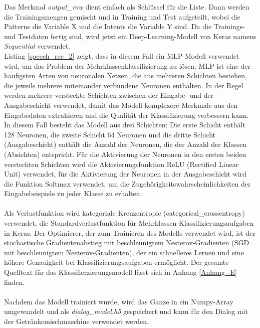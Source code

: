 Das Merkmal \textit{output\_row} dient einfach als Schlüssel für die Liste. 
Dann werden die Trainingsmengen gemischt und in Training und Test aufgeteilt, wobei die Patterns die Variable X und die Intents die Variable Y sind. 
Da die Trainings- und Testdaten fertig sind, wird jetzt ein Deep-Learning-Modell von Keras namens \textit{Sequential} verwendet.\\

Listing \ref{speech_rec_2} zeigt, dass in diesem Fall ein \ac{MLP}-Modell verwendet wird, um das Problem der Mehrklassenklassifizierung zu lösen. 
\ac{MLP} ist eine der häufigsten Arten von neuronalen Netzen, die aus mehreren Schichten bestehen, die jeweils mehrere miteinander verbundene Neuronen enthalten. 
In der Regel werden mehrere versteckte Schichten zwischen der Eingabe- und der Ausgabeschicht verwendet, damit das Modell komplexere Merkmale aus den Eingabedaten extrahieren und die Qualität der Klassifizierung verbessern kann. 
In diesem Fall besteht das Modell aus drei Schichten: Die erste Schicht enthält 128 Neuronen, die zweite Schicht 64 Neuronen und die dritte Schicht (Ausgabeschicht) enthält die Anzahl der Neuronen, die der Anzahl der Klassen (Absichten) entspricht. 
Für die Aktivierung der Neuronen in den ersten beiden versteckten Schichten wird die Aktivierungsfunktion ReLU (Rectified Linear Unit) verwendet, für die Aktivierung der Neuronen in der Ausgabeschicht wird die Funktion Softmax verwendet, um die Zugehörigkeitswahrscheinlichkeiten der Eingabebeispiele zu jeder Klasse zu erhalten.\\\\
Als Verlustfunktion wird kategoriale Kreuzentropie (categorical\_crossentropy) verwendet, die Standardverlustfunktion für Mehrklassen-Klassifizierungsaufgaben in Keras. 
Der Optimierer, der zum Trainieren des Modells verwendet wird, ist der stochastische Gradientenabstieg mit beschleunigtem Nesterov-Gradienten (SGD mit beschleunigtem Nesterov-Gradienten), der ein schnelleres Lernen und eine höhere Genauigkeit bei Klassifizierungsaufgaben ermöglicht. Der gesamte Quelltext für das Klassifierzierungsmodell lässt sich in Anhang \ref{Anhang_E} finden.\\\\
Nachdem das Modell trainiert wurde, wird das Ganze in ein Numpy-Array umgewandelt und als \textit{dialog\_model.h5} gespeichert und kann für den Dialog mit der Getränkemischmaschine verwendet werden.
